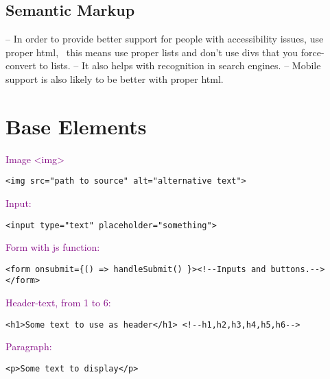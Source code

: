 \documentclass[main.tex,fontsize=6pt,paper=a4,paper=landscape,DIV=calc,]{scrartcl}
\begin{document}
\begin{multicols*}{4}
\subsection{Semantic Markup}
-- In order to provide better support for people with accessibility issues, use proper html,\newline \,\,\, this means use proper lists and don't use divs that you force-convert to lists.\newline
-- It also helps with recognition in search engines.\newline
-- Mobile support is also likely to be better with proper html.



\section{Base Elements}
\textcolor{purple}{Image <img>}
\vspace{-2mm}
\begin{lstlisting}
<img src="path to source" alt="alternative text">
\end{lstlisting}
\vspace{2mm}

\textcolor{purple}{Input:}
\vspace{-2mm}
\begin{lstlisting}
<input type="text" placeholder="something">
\end{lstlisting}
\vspace{2mm}

\textcolor{purple}{Form with js function:}
\vspace{-2mm}
\begin{lstlisting}
<form onsubmit={() => handleSubmit() }><!--Inputs and buttons.--> </form>
\end{lstlisting}
\vspace{2mm}

\textcolor{purple}{Header-text, from 1 to 6:}
\vspace{-2mm}
\begin{lstlisting}
<h1>Some text to use as header</h1> <!--h1,h2,h3,h4,h5,h6-->
\end{lstlisting}
\vspace{2mm}

\textcolor{purple}{Paragraph:}
\vspace{-2mm}
\begin{lstlisting}
<p>Some text to display</p>
\end{lstlisting}
\vspace{2mm}


\end{multicols*}
\end{document}
